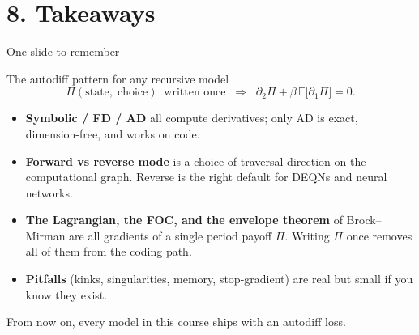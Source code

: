 \documentclass[aspectratio=169,11pt]{beamer}
\newcommand{\emphc}[1]{\textcolor{harvardcrimson}{#1}}
\begin{document}

\section*{8. Takeaways}

\begin{frame}[shrink=15]{One slide to remember}
\small
\begin{block}{The autodiff pattern for any recursive model}
\[
\boxed{\;\Pi(\text{state},\;\text{choice}) \;\;\text{written once} \;\; \Longrightarrow \;\; \partial_2 \Pi + \beta\, \mathbb{E}\bigl[\partial_1 \Pi\bigr] = 0.\;}
\]
\end{block}
\vspace{4pt}
\begin{itemize}\itemsep3pt
\item \textbf{Symbolic / FD / AD} all compute derivatives; only AD is exact, dimension-free, and works on code.
\item \textbf{Forward vs reverse mode} is a choice of traversal direction on the computational graph. Reverse is the right default for DEQNs and neural networks.
\item \textbf{The Lagrangian, the FOC, and the envelope theorem} of Brock--Mirman are all gradients of a single period payoff $\Pi$. Writing $\Pi$ once removes all of them from the coding path.
\item \textbf{Pitfalls} (kinks, singularities, memory, stop-gradient) are real but small if you know they exist.
\end{itemize}
\vspace{4pt}
\centerline{\emphc{From now on, every model in this course ships with an autodiff loss.}}
\end{frame}
\end{document}
